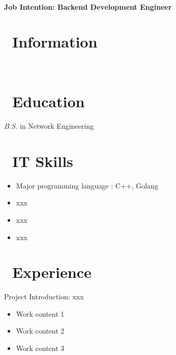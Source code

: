 \documentclass{resume}
\begin{document}

  \hfill \vspace{2mm} \\
\textbf{Job Intention: Backend Development Engineer}

\section{\faInfo\ Information} \vspace{1mm}
{\phone {} \qquad\qquad\quad
\email {} \vspace{2mm} \\
\github {} \qquad
\faLink {}}

\section{\faGraduationCap\ Education} \vspace{1mm}
 \vspace{1mm}
\textit{B.S.} in Network Engineering

\section{\faCogs\ IT Skills} \vspace{1mm}
\begin{itemize}[parsep=1ex]
  \item Major programming language : C++, Golang
  \item xxx
  \item xxx
  \item xxx
\end{itemize}

\section{\faUsers\ Experience}
Project Introduction: xxx
\begin{itemize}[parsep=1ex]
  \item Work content 1
  \item Work content 2
  \item Work content 3
\end{itemize} \vspace{1mm}
\end{document}
